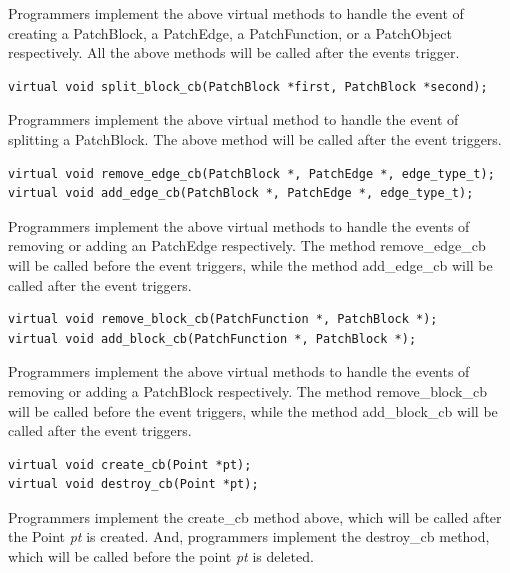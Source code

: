\documentclass[11pt]{article}
\begin{document}
Programmers implement the above virtual methods to handle the event of creating
a PatchBlock, a PatchEdge, a PatchFunction, or a PatchObject respectively. All
the above methods will be called after the events trigger.


\begin{verbatim}
virtual void split_block_cb(PatchBlock *first, PatchBlock *second);

\end{verbatim}



Programmers implement the above virtual method to handle the event of splitting
a PatchBlock. The above method will be called after the event triggers.


\begin{verbatim}
virtual void remove_edge_cb(PatchBlock *, PatchEdge *, edge_type_t);
virtual void add_edge_cb(PatchBlock *, PatchEdge *, edge_type_t);

\end{verbatim}



Programmers implement the above virtual methods to handle the events of removing
or adding an PatchEdge respectively. The method remove\_edge\_cb will be called
before the event triggers, while the method add\_edge\_cb will be called after
the event triggers.


\begin{verbatim}
virtual void remove_block_cb(PatchFunction *, PatchBlock *);
virtual void add_block_cb(PatchFunction *, PatchBlock *);

\end{verbatim}



Programmers implement the above virtual methods to handle the events of removing
or adding a PatchBlock respectively. The method remove\_block\_cb will be called
before the event triggers, while the method add\_block\_cb will be called after
the event triggers.


\begin{verbatim}
virtual void create_cb(Point *pt);
virtual void destroy_cb(Point *pt);

\end{verbatim}



Programmers implement the create\_cb method above, which will be called after
the Point \emph{pt} is created. And, programmers implement the destroy\_cb method,
which will be called before the point \emph{pt} is deleted.
\end{document}
